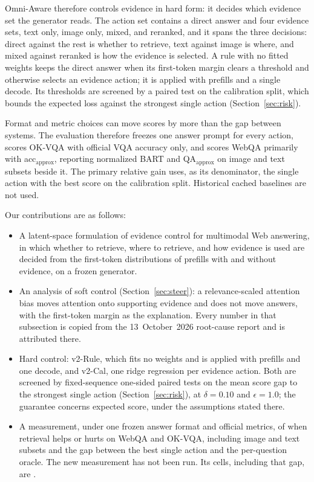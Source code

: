 \documentclass[sigconf,anonymous,review]{acmart}
\newcommand{\ph}{\revhl{X.XX}}
\newcommand{\method}{Omni-Aware}
\begin{document}
\method{} therefore controls evidence in hard form: it decides which evidence set the generator reads.
The action set contains a direct answer and four evidence sets, text only, image only, mixed, and reranked, and it spans the three decisions: direct against the rest is whether to retrieve, text against image is where, and mixed against reranked is how the evidence is selected.
A rule with no fitted weights keeps the direct answer when its first-token margin clears a threshold and otherwise selects an evidence action; it is applied with prefills and a single decode.
Its thresholds are screened by a paired test on the calibration split, which bounds the expected loss against the strongest single action (Section~\ref{sec:risk}).

Format and metric choices can move scores by more than the gap between systems.
The evaluation therefore freezes one answer prompt for every action, scores OK-VQA with official VQA accuracy only, and scores WebQA primarily with acc$_{\mathrm{approx}}$, reporting normalized BART and QA$_{\mathrm{approx}}$ on image and text subsets beside it.
The primary relative gain uses, as its denominator, the single action with the best score on the calibration split.
Historical cached baselines are not used.

Our contributions are as follows:
\begin{itemize}
  \item A latent-space formulation of evidence control for multimodal Web answering, in which whether to retrieve, where to retrieve, and how evidence is used are decided from the first-token distributions of prefills with and without evidence, on a frozen generator.
  \item An analysis of soft control (Section~\ref{sec:steer}): a relevance-scaled attention bias moves attention onto supporting evidence and does not move answers, with the first-token margin as the explanation.
  Every number in that subsection is copied from the 13~October~2026 root-cause report and is attributed there.
  \item Hard control: v2-Rule, which fits no weights and is applied with prefills and one decode, and v2-Cal, one ridge regression per evidence action.
  Both are screened by fixed-sequence one-sided paired tests on the mean score gap to the strongest single action (Section~\ref{sec:risk}), at $\delta=0.10$ and $\epsilon=1.0$; the guarantee concerns expected score, under the assumptions stated there.
  \item A measurement, under one frozen answer format and official metrics, of when retrieval helps or hurts on WebQA and OK-VQA, including image and text subsets and the gap between the best single action and the per-question oracle.
  The new measurement has not been run.
  Its cells, including that gap, are \ph{}.
\end{itemize}
\end{document}
